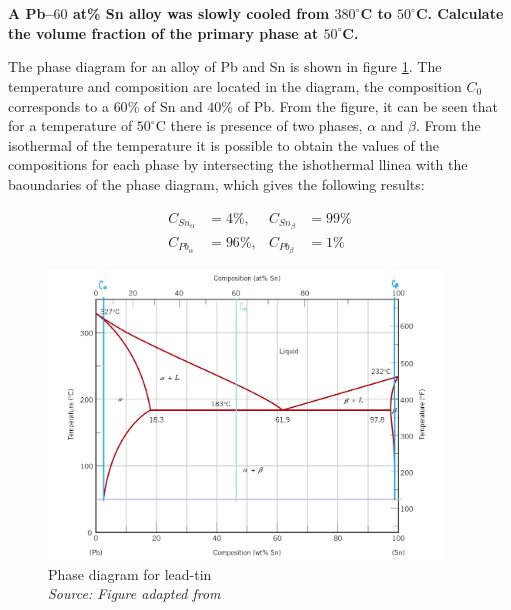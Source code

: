 \section{}

\subsection{}
\textbf{A Pb–$60$ at\% Sn alloy was slowly cooled from $380^{\circ}$C to $50^{\circ}$C. Calculate the volume fraction of the primary phase at $50^{\circ}$C.}

The phase diagram for an alloy of Pb and Sn is shown in figure \ref{fig:diagrama}. The temperature and composition are located in the diagram, the composition $C_0$ corresponds to a $60$\% of Sn and $40$\% of Pb. From the figure, it can be seen that for a temperature of $50^{\circ}$C there is presence of two phases, $\alpha$ and $\beta$. From the isothermal of the temperature it is possible to obtain the values of the compositions for each phase by intersecting the ishothermal llinea with the baoundaries of the phase diagram, which gives the following results:

\begin{align*}
    C_{Sn_{\alpha}}&=4\%, & C_{Sn_{\beta}}&=99\% \\
    C_{Pb_{\alpha}}&=96\%, & C_{Pb_{\beta}}&=1\%
\end{align*}

\begin{figure}[h]
    \centering
    \includegraphics[width=0.93\textwidth]{graficas/diagrama.png}
    \caption{Phase diagram for lead-tin \\
    \textit{Source: Figure adapted from \citep{callister2010materials}}}
    \label{fig:diagrama}
\end{figure}

